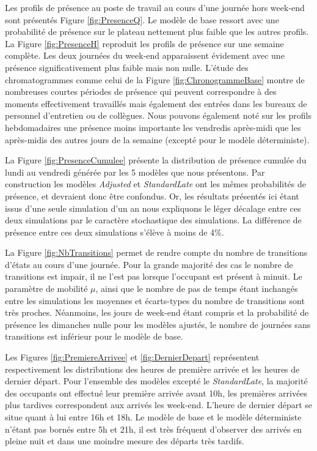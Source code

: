 Les profils de présence au poste de travail au cours d'une journée hors week-end sont présentés Figure \ref{fig:PresenceQ}. Le modèle de base ressort avec une probabilité de présence sur le plateau nettement plus faible que les autres profils. La Figure \ref{fig:PresenceH} reproduit les profils de présence sur une semaine complète. Les deux journées du week-end apparaissent évidement avec une présence significativement plus faible mais non nulle. L'étude des chromatogrammes comme celui de la Figure \ref{fig:ChronogrammeBase} montre de nombreuses courtes périodes de présence qui peuvent correspondre à des moments effectivement travaillés mais également des entrées dans les bureaux de personnel d'entretien ou de collègues. Nous pouvons également noté sur les profils hebdomadaires une présence moins importante les vendredis après-midi que les après-midis des autres jours de la semaine (excepté pour le modèle déterministe).

La Figure \ref{fig:PresenceCumulee} présente la distribution de présence cumulée du lundi au vendredi générée par les 5 modèles que nous présentons. Par construction les modèles \textit{Adjusted} et \textit{StandardLate} ont les mêmes probabilités de présence, et devraient donc être confondus. Or, les résultats présentés ici étant issus d'une seule simulation d'un an nous expliquons le léger décalage entre ces deux simulations par le caractère stochastique des simulations. La différence de présence entre ces deux simulations s'élève à moins de 4\%.  

La Figure \ref{fig:NbTransitions} permet de rendre compte du nombre de transitions d'états au cours d'une journée. Pour la grande majorité des cas le nombre de transitions est impair, il ne l'est pas lorsque l'occupant est présent à minuit. Le paramètre de mobilité $\mu$, ainsi que le nombre de pas de temps étant inchangés entre les simulations les moyennes et écarts-types du nombre de transitions sont très proches. Néanmoins, les jours de week-end étant compris et la probabilité de présence les dimanches nulle pour les modèles ajustés, le nombre de journées sans transitions est inférieur pour le modèle de base.

Les Figures \ref{fig:PremiereArrivee} et \ref{fig:DernierDepart} représentent respectivement les distributions des heures de première arrivée et les heures de dernier départ. Pour l'ensemble des modèles excepté le \textit{StandardLate}, la majorité des occupants ont effectué leur première arrivée avant 10h, les premières arrivées plus tardives correspondent aux arrivés les week-end. L'heure de dernier départ se situe quant à lui entre 16h et 18h. Le modèle de base et le modèle déterministe n'étant pas bornés entre 5h et 21h, il est très fréquent d'observer des arrivés en pleine nuit et dans une moindre mesure des départs très tardifs.

